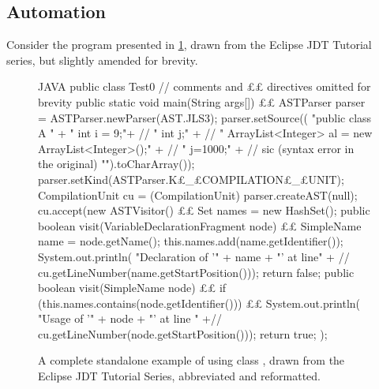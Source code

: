 \subsection{Automation}
\label{section:automation}
Consider the \Java program presented in \cref{figure:eclipse}, drawn from the
Eclipse JDT Tutorial series,
but slightly amended for brevity.

\begin{figure}
  \caption{A complete standalone example of using class , drawn
    from the Eclipse JDT Tutorial Series, abbreviated and reformatted.} \label{figure:eclipse}
    \begin{adjustbox}{max width=\columnwidth}
      \begin{code}[minipage, width=1.13\columnwidth]{JAVA}
public class Test0 { // comments and ££ directives omitted for brevity
  public static void main(String args[]) {££
    ASTParser parser = ASTParser.newParser(AST.JLS3);
    parser.setSource((
      "public class A {\n" +
      " int i = 9;\n"+ //
      " int j;\n" + //
      " ArrayList<Integer> al = new ArrayList<Integer>();\n" + //
      " j=1000;\n" + // sic (syntax error in the original)
      "}\n").toCharArray());
    parser.setKind(ASTParser.K£\_£COMPILATION£\_£UNIT);
    CompilationUnit cu = (CompilationUnit) parser.createAST(null);
    cu.accept(new ASTVisitor() {££
      Set names = new HashSet();
      public boolean visit(VariableDeclarationFragment node) {££
        SimpleName name = node.getName();
        this.names.add(name.getIdentifier());
        System.out.println(
          "Declaration of '" + name + "' at line" + //
          cu.getLineNumber(name.getStartPosition()));
        return false;
      }
      public boolean visit(SimpleName node) {££
        if (this.names.contains(node.getIdentifier())) {££
          System.out.println(
            "Usage of '" + node + "' at line " +//
            cu.getLineNumber(node.getStartPosition()));
        }
        return true;
      }
    });
  }
}
\end{code}
  \end{adjustbox}
\end{figure}

